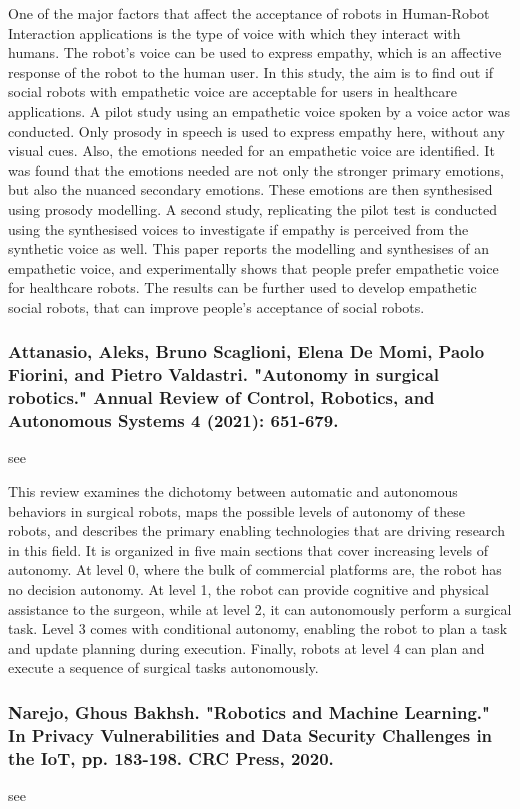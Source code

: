 \documentclass[conference]{IEEEtran}
\begin{document}
One of the major factors that affect the acceptance of robots in Human-Robot Interaction applications is the type of voice with which they interact with humans. The robot’s voice can be used to express empathy, which is an affective response of the robot to the human user. In this study, the aim is to find out if social robots with empathetic voice are acceptable for users in healthcare applications. A pilot study using an empathetic voice spoken by a voice actor was conducted. Only prosody in speech is used to express empathy here, without any visual cues. Also, the emotions needed for an empathetic voice are identified. It was found that the emotions needed are not only the stronger primary emotions, but also the nuanced secondary emotions. These emotions are then synthesised using prosody modelling. A second study, replicating the pilot test is conducted using the synthesised voices to investigate if empathy is perceived from the synthetic voice as well. This paper reports the modelling and synthesises of an empathetic voice, and experimentally shows that people prefer empathetic voice for healthcare robots. The results can be further used to develop empathetic social robots, that can improve people’s acceptance of social robots.

\medskip
\subsubsection{Attanasio, Aleks, Bruno Scaglioni, Elena De Momi, Paolo Fiorini, and Pietro Valdastri. "Autonomy in surgical robotics." Annual Review of Control, Robotics, and Autonomous Systems 4 (2021): 651-679.}
see \cite{attanasio2021autonomy}

This review examines the dichotomy between automatic and autonomous behaviors in surgical robots, maps the possible levels of autonomy of these robots, and describes the primary enabling technologies that are driving research in this field. It is organized in five main sections that cover increasing levels of autonomy. At level 0, where the bulk of commercial platforms are, the robot has no decision autonomy. At level 1, the robot can provide cognitive and physical assistance to the surgeon, while at level 2, it can autonomously perform a surgical task. Level 3 comes with conditional autonomy, enabling the robot to plan a task and update planning during execution. Finally, robots at level 4 can plan and execute a sequence of surgical tasks autonomously.

\medskip
\subsubsection{Narejo, Ghous Bakhsh. "Robotics and Machine Learning." In Privacy Vulnerabilities and Data Security Challenges in the IoT, pp. 183-198. CRC Press, 2020.}
see \cite{narejo2020robotics}
\end{document}

